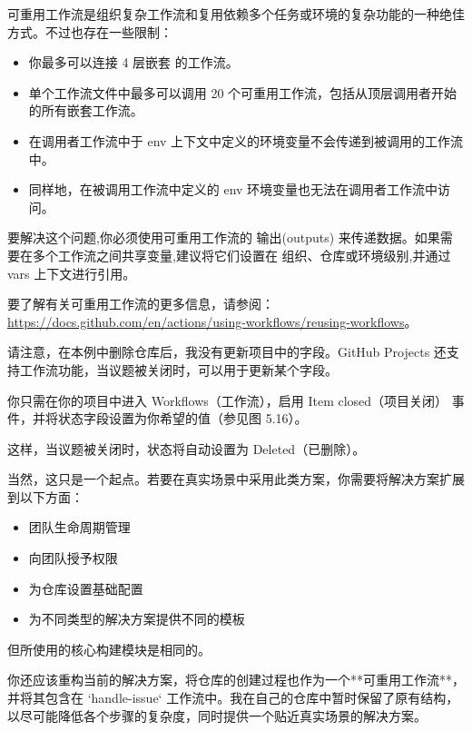 可重用工作流是组织复杂工作流和复用依赖多个任务或环境的复杂功能的一种绝佳方式。不过也存在一些限制：

\begin{itemize}
\item 
你最多可以连接 4 层嵌套 的工作流。

\item 
单个工作流文件中最多可以调用 20 个可重用工作流，包括从顶层调用者开始的所有嵌套工作流。

\item 
在调用者工作流中于 env 上下文中定义的环境变量不会传递到被调用的工作流中。

\item 
同样地，在被调用工作流中定义的 env 环境变量也无法在调用者工作流中访问。
\end{itemize}

要解决这个问题,你必须使用可重用工作流的 输出(outputs) 来传递数据。如果需要在多个工作流之间共享变量,建议将它们设置在 组织、仓库或环境级别,并通过 vars 上下文进行引用。

要了解有关可重用工作流的更多信息，请参阅：\url{https://docs.github.com/en/actions/using-workflows/reusing-workflows}。

请注意，在本例中删除仓库后，我没有更新项目中的字段。GitHub Projects 还支持工作流功能，当议题被关闭时，可以用于更新某个字段。

你只需在你的项目中进入 Workflows（工作流），启用 Item closed（项目关闭） 事件，并将状态字段设置为你希望的值（参见图 5.16）。


这样，当议题被关闭时，状态将自动设置为 Deleted（已删除）。


当然，这只是一个起点。若要在真实场景中采用此类方案，你需要将解决方案扩展到以下方面：

\begin{itemize}
\item 
团队生命周期管理

\item 
向团队授予权限

\item 
为仓库设置基础配置

\item 
为不同类型的解决方案提供不同的模板
\end{itemize}

但所使用的核心构建模块是相同的。

你还应该重构当前的解决方案，将仓库的创建过程也作为一个**可重用工作流**，并将其包含在 `handle-issue` 工作流中。我在自己的仓库中暂时保留了原有结构，以尽可能降低各个步骤的复杂度，同时提供一个贴近真实场景的解决方案。



















